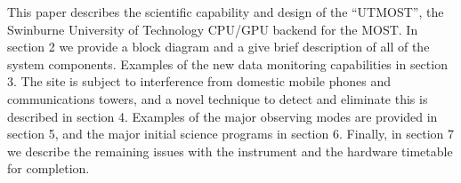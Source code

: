 This paper describes the scientific capability and design of the ``UTMOST'', the Swinburne University of Technology CPU/GPU backend for the MOST. In section 2 we provide a block diagram and a give brief description of all of the system components. Examples of the new data monitoring capabilities in section 3. The site is subject to interference from domestic mobile phones and communications towers, and a novel technique to detect and eliminate this is described in section 4. Examples of the major observing modes are provided in section 5, and the major initial science programs in section 6. Finally, in section 7 we describe the remaining issues with the instrument and the hardware timetable for completion.